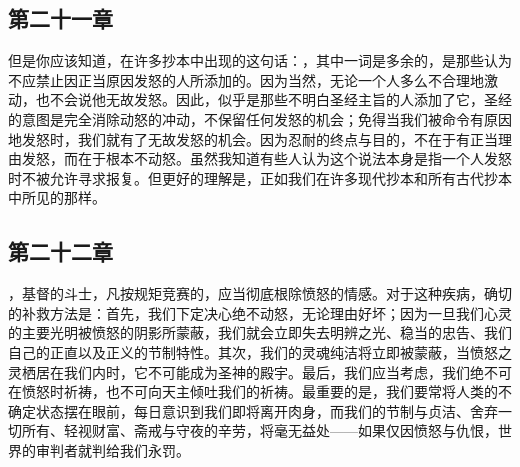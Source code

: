 
\subsection{第二十一章}

\par

但是你应该知道，在许多抄本中出现的这句话：，其中一词是多余的，是那些认为不应禁止因正当原因发怒的人所添加的。因为当然，无论一个人多么不合理地激动，也不会说他无故发怒。因此，似乎是那些不明白圣经主旨的人添加了它，圣经的意图是完全消除动怒的冲动，不保留任何发怒的机会；免得当我们被命令有原因地发怒时，我们就有了无故发怒的机会。因为忍耐的终点与目的，不在于有正当理由发怒，而在于根本不动怒。虽然我知道有些人认为这个说法本身是指一个人发怒时不被允许寻求报复。但更好的理解是，正如我们在许多现代抄本和所有古代抄本中所见的那样。\par


\subsection{第二十二章}

\par

，基督的斗士，凡按规矩竞赛的，应当彻底根除愤怒的情感。对于这种疾病，确切的补救方法是：首先，我们下定决心绝不动怒，无论理由好坏；因为一旦我们心灵的主要光明被愤怒的阴影所蒙蔽，我们就会立即失去明辨之光、稳当的忠告、我们自己的正直以及正义的节制特性。其次，我们的灵魂纯洁将立即被蒙蔽，当愤怒之灵栖居在我们内时，它不可能成为圣神的殿宇。最后，我们应当考虑，我们绝不可在愤怒时祈祷，也不可向天主倾吐我们的祈祷。最重要的是，我们要常将人类的不确定状态摆在眼前，每日意识到我们即将离开肉身，而我们的节制与贞洁、舍弃一切所有、轻视财富、斋戒与守夜的辛劳，将毫无益处——如果仅因愤怒与仇恨，世界的审判者就判给我们永罚。\par


